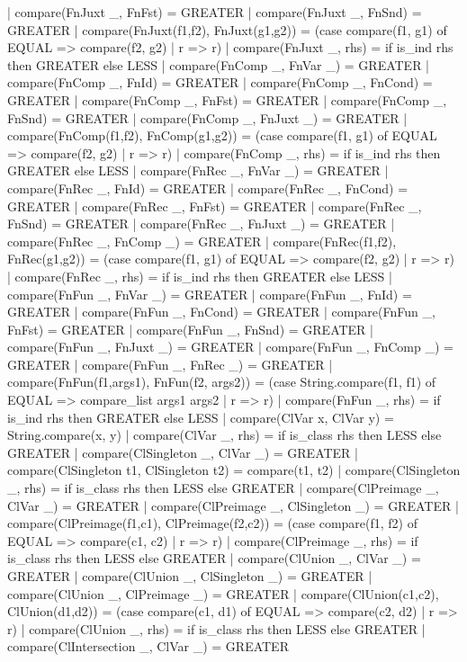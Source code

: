   | compare(FnJuxt _, FnFst) = GREATER
  | compare(FnJuxt _, FnSnd) = GREATER
  | compare(FnJuxt(f1,f2), FnJuxt(g1,g2)) =
     (case compare(f1, g1) of
       EQUAL => compare(f2, g2)
     | r => r)
  | compare(FnJuxt _, rhs) = if is_ind rhs then GREATER else LESS
  | compare(FnComp _, FnVar _) = GREATER
  | compare(FnComp _, FnId) = GREATER
  | compare(FnComp _, FnCond) = GREATER
  | compare(FnComp _, FnFst) = GREATER
  | compare(FnComp _, FnSnd) = GREATER
  | compare(FnComp _, FnJuxt _) = GREATER
  | compare(FnComp(f1,f2), FnComp(g1,g2)) =
     (case compare(f1, g1) of
       EQUAL => compare(f2, g2)
     | r => r)
  | compare(FnComp _, rhs) = if is_ind rhs then GREATER else LESS
  | compare(FnRec _, FnVar _) = GREATER
  | compare(FnRec _, FnId) = GREATER
  | compare(FnRec _, FnCond) = GREATER
  | compare(FnRec _, FnFst) = GREATER
  | compare(FnRec _, FnSnd) = GREATER
  | compare(FnRec _, FnJuxt _) = GREATER
  | compare(FnRec _, FnComp _) = GREATER
  | compare(FnRec(f1,f2), FnRec(g1,g2)) =
     (case compare(f1, g1) of
       EQUAL => compare(f2, g2)
     | r => r)
  | compare(FnRec _, rhs) = if is_ind rhs then GREATER else LESS
  | compare(FnFun _, FnVar _) = GREATER
  | compare(FnFun _, FnId) = GREATER
  | compare(FnFun _, FnCond) = GREATER
  | compare(FnFun _, FnFst) = GREATER
  | compare(FnFun _, FnSnd) = GREATER
  | compare(FnFun _, FnJuxt _) = GREATER
  | compare(FnFun _, FnComp _) = GREATER
  | compare(FnFun _, FnRec _) = GREATER
  | compare(FnFun(f1,args1), FnFun(f2, args2)) =
     (case String.compare(f1, f1) of
       EQUAL => compare_list args1 args2
     | r => r)
  | compare(FnFun _, rhs) = if is_ind rhs then GREATER else LESS
  | compare(ClVar x, ClVar y) = String.compare(x, y)
  | compare(ClVar _, rhs) = if is_class rhs then LESS else GREATER
  | compare(ClSingleton _, ClVar _) = GREATER
  | compare(ClSingleton t1, ClSingleton t2) = compare(t1, t2)
  | compare(ClSingleton _, rhs) = if is_class rhs then LESS else GREATER
  | compare(ClPreimage _, ClVar _) = GREATER
  | compare(ClPreimage _, ClSingleton _) = GREATER
  | compare(ClPreimage(f1,c1), ClPreimage(f2,c2)) =
     (case compare(f1, f2) of
       EQUAL => compare(c1, c2)
     | r => r)
  | compare(ClPreimage _, rhs) = if is_class rhs then LESS else GREATER
  | compare(ClUnion _, ClVar _) = GREATER
  | compare(ClUnion _, ClSingleton _) = GREATER
  | compare(ClUnion _, ClPreimage _) = GREATER
  | compare(ClUnion(c1,c2), ClUnion(d1,d2)) =
     (case compare(c1, d1) of
       EQUAL => compare(c2, d2)
     | r => r)
  | compare(ClUnion _, rhs) = if is_class rhs then LESS else GREATER
  | compare(ClIntersection _, ClVar _) = GREATER
